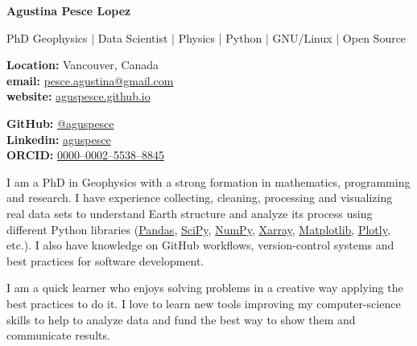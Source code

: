 \documentclass[10pt, a4paper]{article}
\makeatletter
\newcommand{\firstname}{Agustina}
\newcommand{\familyname}{Pesce Lopez}
\newcommand{\email}{pesce.agustina@gmail.com}
\newcommand{\website}{aguspesce.github.io}
\newcommand{\github}{aguspesce}
\newcommand{\linkedin}{aguspesce}
\newcommand{\orcid}{0000--0002--5538--8845}
\newcommand{\xarray}{\href{https://xarray.dev/}{Xarray}}
\newcommand{\matplotlib}{\href{https://matplotlib.org/}{Matplotlib}}
\newcommand{\numpy}{\href{https://numpy.org/}{NumPy}}
\newcommand{\pandas}{\href{https://pandas.pydata.org/}{Pandas}}
\newcommand{\plotly}{\href{https://plotly.com/python/}{Plotly}}
\newcommand{\scipy}{\href{https://scipy.org/}{SciPy}}
\newcommand{\fullname}{\firstname{} \familyname}
\newcommand{\maintitle}[1]{
    \begin{center}
        \textbf{\Huge #1}
    \end{center}
}
\newcommand{\subtitle}[1]{
    \begin{center}
        {\large #1}
    \end{center}
}
\newcommand{\affiliation}[1]{
    \begin{center}
        {#1}
    \end{center}
}
\newcommand{\entriespad}{0.75em}
\newcommand{\MAIL}[1]{\href{mailto:#1}{#1}}
\newcommand{\GITHUB}[1]{\href{https://github.com/#1}{@#1}}
\newcommand{\ORCID}[1]{\href{https://orcid.org/#1}{#1}}
\newcommand{\WEBSITE}[1]{\href{https://#1}{#1}}
\newcommand{\LINKEDIN}[1]{\href{https://linkedin.com/in/#1}{#1}}
\makeatother
\begin{document}
\maintitle{\fullname}
\subtitle{PhD Geophysics | Data Scientist | Physics | Python | GNU/Linux | Open
Source}
\vspace{\entriespad}

\begin{minipage}[t]{0.60\linewidth}
    \begin{flushleft}
        \textbf{Location:} Vancouver, Canada
        \\
        \textbf{email:} \MAIL{\email}
        \\
        \textbf{website:} \WEBSITE{\website}
    \end{flushleft}
\end{minipage}
\hfill
\begin{minipage}[t]{0.40\linewidth}
    \begin{flushright}
        \textbf{GitHub:} \GITHUB{\github}
        \\
        \textbf{Linkedin:} \LINKEDIN{\linkedin}
        \\
        \textbf{ORCID:} \ORCID{\orcid}
    \end{flushright}
\end{minipage}

\vspace{\entriespad}



\vspace{\entriespad}

I am a PhD in Geophysics with a strong formation in mathematics, programming
and research.
I have experience collecting, cleaning, processing and visualizing real data
sets to understand Earth structure and analyze its process using different
Python libraries (\pandas{}, \scipy{}, \numpy{}, \xarray{}, \matplotlib{},
\plotly{}, etc.).
I also have knowledge on GitHub workflows, version-control systems and
best practices for software development.
\vspace{\entriespad}

I am a quick learner who enjoys solving problems in a creative way applying the
best practices to do it.
I love to learn new tools improving my computer-science skills to help to
analyze data and fund the best way to show them and communicate results.
\end{document}
